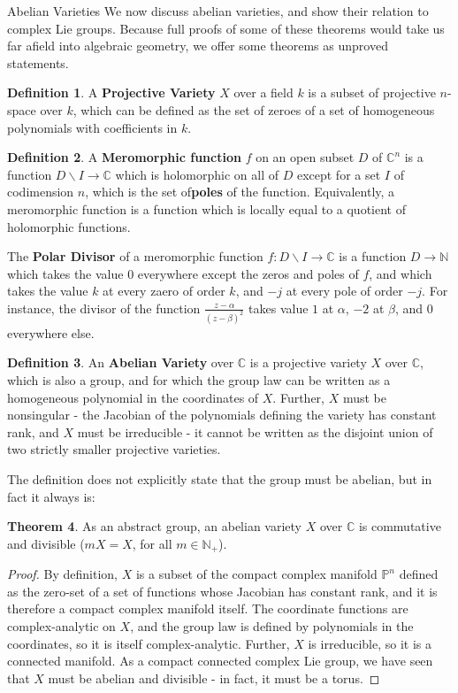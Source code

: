 \documentclass[12pt]{article}
\newcommand{\N}{\mathbb{N}}
\newcommand{\C}{\mathbb{C}}
\newcommand{\bs}{\backslash}
\theoremstyle{definition}
\newtheorem{theorem}{Theorem}[section]
\newtheorem{definition}[theorem]{Definition}
\begin{document}
\begin{section}{Abelian Varieties}
	We now discuss abelian varieties, and show their relation to complex Lie groups. Because full proofs of some of these theorems would take us far afield into algebraic geometry, we offer some theorems as unproved statements.
	\begin{definition}
		A \textbf{Projective Variety} $X$ over a field $k$ is a subset of projective $n$-space over $k$, which can be defined as the set of zeroes of a set of homogeneous polynomials with coefficients in $k$. 
		\label{projvar}
	\end{definition}
	\begin{definition}
		A \textbf{Meromorphic function} $f$ on an open subset $D$ of $\C^n$ is a function $ D \bs I \to \C$ which is holomorphic on all of $D$ except for a set $I$ of codimension $n$, which is the set of\textbf{poles} of the function. Equivalently, a meromorphic function is a function which is locally equal to a quotient of holomorphic functions.
		\par The \textbf{Polar Divisor} of a meromorphic function $f: D \bs I \to \C$ is a function $D \to \N$ which takes the value $0$ everywhere except the zeros and poles of $f$, and which takes the value $k$ at every zaero of order $k$, and $-j$ at every pole of order $-j$. For instance, the divisor of the function $\frac{z - \alpha}{(z - \beta)^2}$ takes value $1$ at $\alpha$, $-2$ at $\beta$, and $0$ everywhere else.
		\label{mero}
	\end{definition}
	\begin{definition}
		An \textbf{Abelian Variety} over $\C$ is a projective variety $X$ over $\C$, which is also a group, and for which the group law can be written as a homogeneous polynomial in the coordinates of $X$. Further, $X$ must be nonsingular - the Jacobian of the polynomials defining the variety has constant rank, and $X$ must be irreducible - it cannot be written as the disjoint union of two strictly smaller projective varieties.
		\label{abvar}
	\end{definition}
	The definition does not explicitly state that the group must be abelian, but in fact it always is:
	\begin{theorem}
		As an abstract group, an abelian variety $X$ over $\C$ is commutative and divisible ($mX = X$, for all $m \in \N_+$).
		\begin{proof}
			By definition, $X$ is a subset of the compact complex manifold $\mathbb{P}^n$ defined as the zero-set of a set of functions whose Jacobian has constant rank, and it is therefore a compact complex manifold itself. The coordinate functions are complex-analytic on $X$, and the group law is defined by polynomials in the coordinates, so it is itself complex-analytic. Further, $X$ is irreducible, so it is a connected manifold. As a compact connected complex Lie group, we have seen that $X$ must be abelian and divisible - in fact, it must be a torus.

\end{proof}
\end{theorem}
\end{section}
\end{document}
